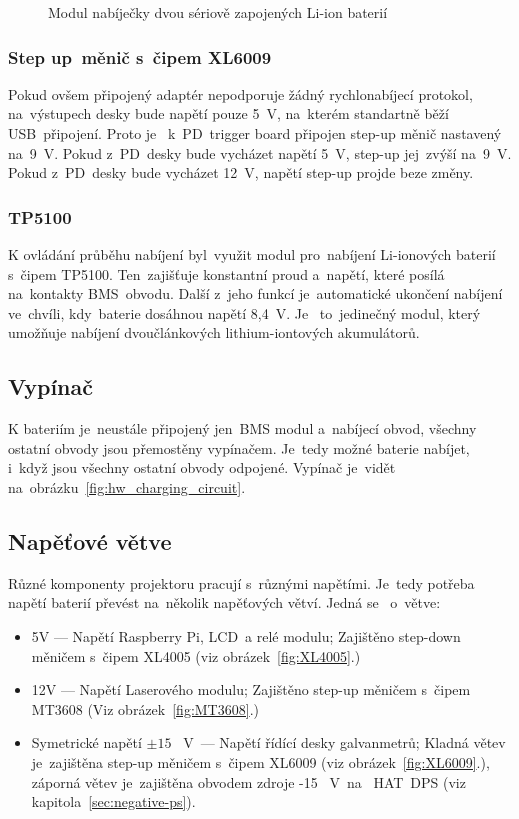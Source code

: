 \begin{figure}[htb]
\begin{minipage}{0.3\textwidth}
    \caption{\label{fig:TP5100} Modul nabíječky dvou sériově zapojených Li-ion baterií~\cite{laskakit-TP5100}}
  \end{minipage}
\end{figure}

\subsubsection{Step up~měnič  s~čipem XL6009}
Pokud ovšem připojený adaptér nepodporuje žádný rychlonabíjecí protokol, na~výstupech desky bude napětí pouze 5~V, na~kterém standartně běží  USB~připojení. Proto je ~k~PD~trigger board připojen step-up měnič nastavený na~9~V.
Pokud  z~PD~desky bude vycházet napětí 5~V, step-up  jej~zvýší na~9~V. Pokud  z~PD~desky bude vycházet 12~V, napětí step-up projde beze změny.

\subsubsection{TP5100}
K ovládání průběhu nabíjení  byl~využit modul  pro~nabíjení Li-ionových baterií  s~čipem TP5100.  Ten~zajišťuje konstantní proud  a~napětí, které posílá na~kontakty  BMS~obvodu. Další  z~jeho funkcí je~automatické ukončení nabíjení ve~chvíli,  kdy~baterie dosáhnou napětí 8,4~V. Je ~to~jedinečný modul, který umožňuje nabíjení dvoučlánkových lithium-iontových akumulátorů.

\subsection{Vypínač}
K bateriím je~neustále připojený  jen~BMS modul  a~nabíjecí obvod, všechny ostatní obvody jsou přemostěny vypínačem. Je~tedy možné baterie nabíjet,  i~když jsou všechny ostatní obvody odpojené. Vypínač je~vidět na~obrázku~\ref{fig:hw_charging_circuit}.

\subsection{Napěťové větve}
Různé komponenty projektoru pracují  s~různými napětími. Je~tedy potřeba napětí baterií převést na~několik napěťových větví. Jedná se ~o~větve:

\begin{itemize}
  \item 5V --- Napětí Raspberry Pi,  LCD~a relé modulu; Zajištěno step-down měničem  s~čipem XL4005 (viz obrázek~\ref{fig:XL4005}.)
  \item 12V --- Napětí Laserového modulu; Zajištěno step-up měničem  s~čipem MT3608 (Viz obrázek~\ref{fig:MT3608}.)
  \item Symetrické napětí $\pm{}15$ ~V~--- Napětí řídící desky galvanmetrů; Kladná větev je~zajištěna step-up měničem  s~čipem XL6009 (viz obrázek~\ref{fig:XL6009}.), záporná větev je~zajištěna obvodem zdroje -15 ~V~na ~HAT~DPS (viz kapitola~\ref{sec:negative-ps}).
\end{itemize}


